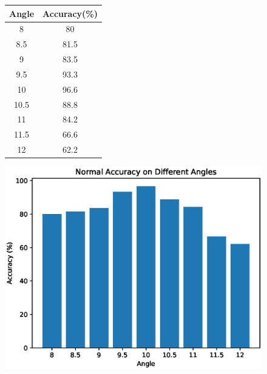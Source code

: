 \begin{figure}[htbp]
    \centering
    \begin{minipage}{0.4\textwidth}
        \centering
        \begin{tabular}{cc}
            \toprule
            Angle & Accuracy(\%) \\
            \midrule
            8 & 80 \\
            8.5 & 81.5 \\
            9 & 83.5 \\
            9.5 & 93.3 \\
            10 & 96.6 \\
            10.5 & 88.8 \\
            11 & 84.2 \\
            11.5 & 66.6 \\
            12 & 62.2 \\
            \bottomrule
        \end{tabular}
        \label{tab:model_accuracy_angle}
    \end{minipage}
    \begin{minipage}{0.55\textwidth}
        \centering
        \includegraphics[width=\textwidth]{./fig/assistplot/angle_accuracy.eps}
        \label{fig:angle_accuracy_histogram}
    \end{minipage}
\end{figure}


